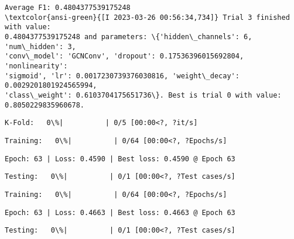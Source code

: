 \documentclass[11pt]{article}
\begin{document}
    
    \begin{Verbatim}[commandchars=\\\{\}]
Average F1: 0.4804377539175248
\textcolor{ansi-green}{[I 2023-03-26 00:56:34,734]} Trial 3 finished with value:
0.4804377539175248 and parameters: \{'hidden\_channels': 6, 'num\_hidden': 3,
'conv\_model': 'GCNConv', 'dropout': 0.17536396015692804, 'nonlinearity':
'sigmoid', 'lr': 0.0017230739376030816, 'weight\_decay': 0.0029201801924565994,
'class\_weight': 0.6103704175651736\}. Best is trial 0 with value:
0.8050229835960678.
    \end{Verbatim}

    
    \begin{Verbatim}[commandchars=\\\{\}]
K-Fold:   0\%|          | 0/5 [00:00<?, ?it/s]
    \end{Verbatim}

    
    
    \begin{Verbatim}[commandchars=\\\{\}]
Training:   0\%|          | 0/64 [00:00<?, ?Epochs/s]
    \end{Verbatim}

    
    \begin{Verbatim}[commandchars=\\\{\}]
Epoch: 63 | Loss: 0.4590 | Best loss: 0.4590 @ Epoch 63
    \end{Verbatim}

    
    \begin{Verbatim}[commandchars=\\\{\}]
Testing:   0\%|          | 0/1 [00:00<?, ?Test cases/s]
    \end{Verbatim}

    
    
    \begin{Verbatim}[commandchars=\\\{\}]
Training:   0\%|          | 0/64 [00:00<?, ?Epochs/s]
    \end{Verbatim}

    
    \begin{Verbatim}[commandchars=\\\{\}]
Epoch: 63 | Loss: 0.4663 | Best loss: 0.4663 @ Epoch 63
    \end{Verbatim}

    
    \begin{Verbatim}[commandchars=\\\{\}]
Testing:   0\%|          | 0/1 [00:00<?, ?Test cases/s]
    \end{Verbatim}
\end{document}
